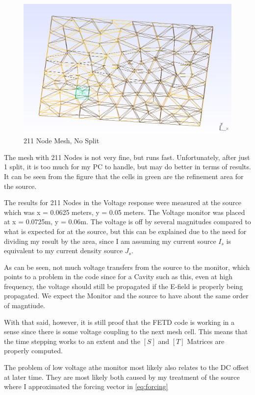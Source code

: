 \documentclass[11pt,a4paper,oldfontcommands]{memoir}
\begin{document}
\begin{figure}
  \includegraphics[width=\linewidth]{211Nodes_cavityWithSourceAt650x500y_75_DLI.PNG}
  \caption{211 Node Mesh, No Split}
  \label{fig:mesh39}
\end{figure}

The mesh with 211 Nodes is not very fine, but runs fast. Unfortunately, after just 1 split, it is too much for my PC to handle, but may do better in terms of results. It can be seen from the figure that the cells in green are the refinement area for the source.

The results for 211 Nodes in the Voltage response were measured at the source which was x = 0.0625 meters, y = 0.05 meters. The Voltage monitor was placed at x = 0.0725m, y = 0.06m.
The voltage is off by several magnitudes compared to what is expected for at the source, but this can be explained due to the need for dividing my result by the area, since I am assuming my current source $I_s$ is equivalent to my current density source $J_s$. 

As can be seen, not much voltage transfers from the source to the monitor, which points to a problem in the code since for a Cavity such as this, even at high frequency, the voltage should still be propagated if the E-field is properly being propagated. We expect the Monitor and the source to have about the same order of magntiude.

With that said, however, it is still proof that the FETD code is working in a sense since there is some voltage coupling to the next mesh cell. This means that the time stepping works to an extent and the $[S]$ and $[T]$ Matrices are properly computed.

The problem of low voltage athe monitor most likely also relates to the DC offset at later time. They are most likely both caused by my treatment of the source where I approximated the forcing vector in \ref{eq:forcing}
\end{document}
